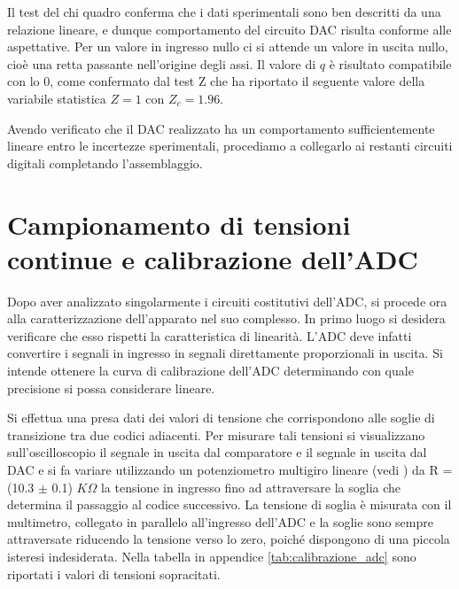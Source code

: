 \documentclass[journal]{IEEEtran}
\begin{document}
Il test del chi quadro conferma che i dati sperimentali sono ben descritti da una relazione lineare, e dunque comportamento del circuito DAC risulta conforme alle aspettative. Per un valore in ingresso nullo ci si attende un valore in uscita nullo, cioè una retta passante nell'origine degli assi. Il valore di $q$ è risultato compatibile con lo 0, come confermato dal test Z che ha riportato il seguente valore della variabile statistica $Z = 1 $ con $ Z_c = 1.96$.

Avendo verificato che il DAC realizzato ha un comportamento sufficientemente lineare entro le incertezze sperimentali, procediamo a collegarlo ai restanti circuiti digitali completando l'assemblaggio.



\section{Campionamento di tensioni continue e calibrazione dell'ADC}
Dopo aver analizzato singolarmente i circuiti costitutivi dell'ADC, si procede ora alla caratterizzazione dell'apparato nel suo complesso.
In primo luogo si desidera verificare che esso rispetti la caratteristica di linearità. L'ADC deve infatti convertire i segnali in ingresso in segnali direttamente proporzionali in uscita. Si intende ottenere la curva di calibrazione dell'ADC determinando con quale precisione si possa considerare lineare.

Si effettua una presa dati dei valori di tensione che corrispondono alle soglie di transizione tra due codici adiacenti. Per misurare tali tensioni si visualizzano sull'oscilloscopio il segnale in uscita dal comparatore e il segnale in uscita dal DAC e si fa variare utilizzando un potenziometro multigiro lineare (vedi \cite{K}) da R = (10.3 $\pm$ 0.1) $K\Omega$ la tensione in ingresso fino ad attraversare la soglia che determina il passaggio al codice successivo. La tensione di soglia è misurata con il multimetro, collegato in parallelo all'ingresso dell'ADC e la soglie sono sempre attraversate riducendo la tensione verso lo zero, poiché dispongono di una piccola isteresi indesiderata.
Nella tabella in appendice \ref{tab:calibrazione_adc} sono riportati i valori di tensioni sopracitati.
\end{document}

